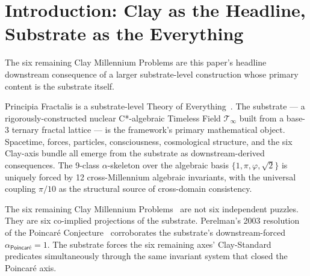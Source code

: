 \documentclass[11pt,a4paper]{amsart}
\theoremstyle{plain}
\theoremstyle{definition}
\begin{document}
\section{Introduction: Clay as the Headline, Substrate as the Everything}\label{sec:intro}

The six remaining Clay Millennium Problems are this paper's headline downstream consequence of a larger substrate-level construction whose primary content is the substrate itself.

Principia Fractalis is a substrate-level Theory of Everything~\cite{cohen2026book,cohen2025unifiedClay,cohen2026corroborating}. The substrate --- a rigorously-constructed nuclear C*-algebraic Timeless Field $\mathcal{T}_\infty$ built from a base-3 ternary fractal lattice --- is the framework's primary mathematical object. Spacetime, forces, particles, consciousness, cosmological structure, and the six Clay-axis bundle all emerge from the substrate as downstream-derived consequences. The 9-class $\alpha$-skeleton over the algebraic basis $\{1, \pi, \varphi, \sqrt{2}\}$ is uniquely forced by 12 cross-Millennium algebraic invariants, with the universal coupling $\pi/10$ as the structural source of cross-domain consistency.

The six remaining Clay Millennium Problems~\cite{clay2000} are not six independent puzzles. They are six co-implied projections of the substrate. Perelman's 2003 resolution of the Poincar\'e Conjecture~\cite{perelman2003} corroborates the substrate's downstream-forced $\alpha_{\textsf{Poincar\'e}} = 1$. The substrate forces the six remaining axes' Clay-Standard predicates simultaneously through the same invariant system that closed the Poincar\'e axis.
\end{document}
